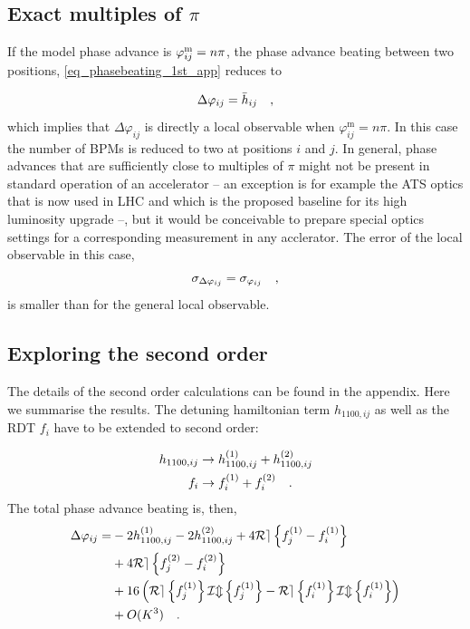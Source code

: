 \subsection{Exact multiples of \texorpdfstring{$\pi$}{pi}}

If the model phase advance is $\varphi_{ij}^\text{m} = n\pi$, the phase advance beating between two positions,
\eqref{eq_phasebeating_1st_app} reduces to

\begin{equation}
  \Delta\varphi_{ij} = \bar{h}_{ij}
  \quad ,
  \label{eq_npi_localobs}
\end{equation}
which implies that $\Delta \varphi_{ij}$ is directly a local observable when
$\varphi_{ij}^\text{m}=n\pi$.
In this case the number of BPMs is reduced to two at positions $i$ and
$j$.
In general, phase advances that are sufficiently close to multiples of $\pi$ might not be present in
standard operation of an accelerator -- an exception is for example the ATS optics
\cite{Fartoukh2013} that is now used
in LHC and which is the proposed baseline for its high luminosity upgrade --, but it would be conceivable to prepare
special optics settings for a corresponding measurement in any acclerator.
The error of the local observable in this case,
\begin{equation}
    \sigma_{\Delta\varphi_{ij}} = \sigma_{\varphi_{ij}}
    \quad ,
    \label{eq_error_npi}
\end{equation}
is smaller than for the general local observable.

\subsection{Exploring the second order}
\label{ssec:second_order_phasebeating}

The details of the second order calculations can be found in the appendix. Here we summarise the results.
The detuning hamiltonian term $h_{1100,ij} $ as well as the RDT $f_{i} $ have to be extended to second order:

\begin{align}
  h_{1100,ij} &\rightarrow h_{1100,ij}^{(1)} + h_{1100,ij}^{(2)}\\
  f_{i} &\rightarrow f_{i}^{(1)} + f_{i}^{(2)}
  \quad .
  \label{eq_1st--2nd}
\end{align}
The total phase advance beating is, then,
\begin{align}
  \Delta\varphi_{ij} = &-2h_{1100,ij}^{(1)} 
  - 2h^{(2)}_{1100,ij}
  + 4\mathcal{Re} \left\{ f_j^{(1)} - f_i^{(1)} \right\} \notag\\
  &+ 4\mathcal{Re} \left\{ f_j^{(2)} - f_i^{(2)} \right\}\notag \\
  &+ 16 \left( \mathcal{Re} \left\{ f_j^{(1)} \right\} \mathcal{Im} \left\{ f_j^{(1)} \right\} - \mathcal{Re} \left\{ f_i^{(1)} \right\} \mathcal{Im} \left\{ f_i^{(1)} \right\} \right)\notag\\
  &+ O(K^{3})
  \quad .
  \label{eq_phadvbeating_2nd_inline}
\end{align}

